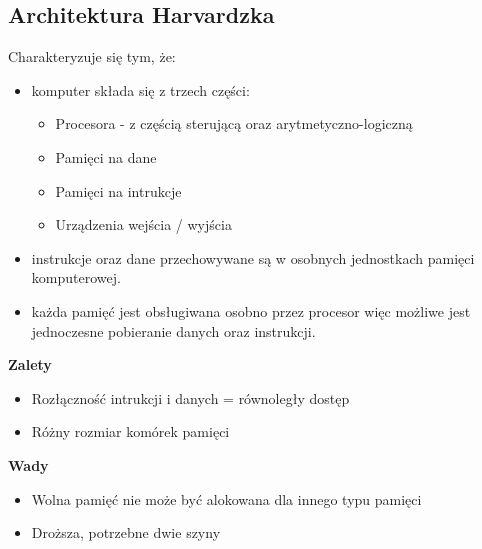 \documentclass[../main.tex]{subfiles}
\begin{document}
\subsection{Architektura Harvardzka}
Charakteryzuje się tym, że:
\begin{itemize}
    \item komputer składa się z trzech części:
    \begin{itemize}
        \item Procesora - z częścią sterującą oraz arytmetyczno-logiczną
        \item Pamięci na dane
        \item Pamięci na intrukcje
        \item Urządzenia wejścia / wyjścia
    \end{itemize}
    \item instrukcje oraz dane przechowywane są w osobnych jednostkach pamięci komputerowej.
    \item każda pamięć jest obsługiwana osobno przez procesor więc możliwe jest jednoczesne pobieranie danych oraz instrukcji.
\end{itemize}

\textbf{Zalety}
\begin{itemize}
    \item Rozłączność intrukcji i danych = równoległy dostęp
    \item Różny rozmiar komórek pamięci
\end{itemize}

\textbf{Wady}
\begin{itemize}
    \item Wolna pamięć nie może być alokowana dla innego typu pamięci
    \item Droższa, potrzebne dwie szyny
\end{itemize}
\end{document}

